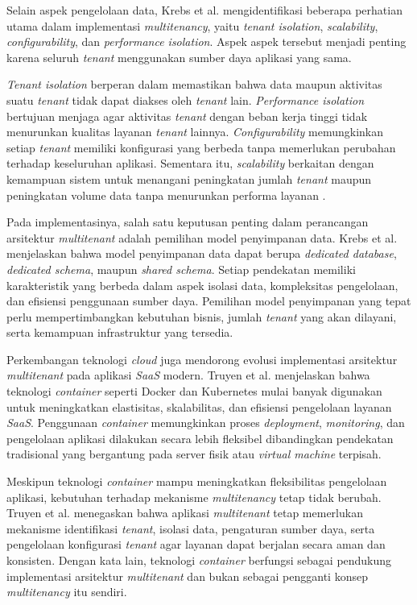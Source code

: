 Selain aspek pengelolaan data, Krebs et al. \cite{ref4} mengidentifikasi beberapa perhatian utama dalam implementasi \textit{multitenancy}, yaitu \textit{tenant isolation}, \textit{scalability}, \textit{configurability}, dan \textit{performance isolation}. Aspek aspek tersebut menjadi penting karena seluruh \textit{tenant} menggunakan sumber daya aplikasi yang sama.

\textit{Tenant isolation} berperan dalam memastikan bahwa data maupun aktivitas suatu \textit{tenant} tidak dapat diakses oleh \textit{tenant} lain. \textit{Performance isolation} bertujuan menjaga agar aktivitas \textit{tenant} dengan beban kerja tinggi tidak menurunkan kualitas layanan \textit{tenant} lainnya. \textit{Configurability} memungkinkan setiap \textit{tenant} memiliki konfigurasi yang berbeda tanpa memerlukan perubahan terhadap keseluruhan aplikasi. Sementara itu, \textit{scalability} berkaitan dengan kemampuan sistem untuk menangani peningkatan jumlah \textit{tenant} maupun peningkatan volume data tanpa menurunkan performa layanan \cite{ref12}.

Pada implementasinya, salah satu keputusan penting dalam perancangan arsitektur \textit{multitenant} adalah pemilihan model penyimpanan data. Krebs et al. \cite{ref12} menjelaskan bahwa model penyimpanan data dapat berupa \textit{dedicated database}, \textit{dedicated schema}, maupun \textit{shared schema}. Setiap pendekatan memiliki karakteristik yang berbeda dalam aspek isolasi data, kompleksitas pengelolaan, dan efisiensi penggunaan sumber daya. Pemilihan model penyimpanan yang tepat perlu mempertimbangkan kebutuhan bisnis, jumlah \textit{tenant} yang akan dilayani, serta kemampuan infrastruktur yang tersedia.

Perkembangan teknologi \textit{cloud} juga mendorong evolusi implementasi arsitektur \textit{multitenant} pada aplikasi \textit{SaaS} modern. Truyen et al. \cite{ref13} menjelaskan bahwa teknologi \textit{container} seperti Docker dan Kubernetes mulai banyak digunakan untuk meningkatkan elastisitas, skalabilitas, dan efisiensi pengelolaan layanan \textit{SaaS}. Penggunaan \textit{container} memungkinkan proses \textit{deployment}, \textit{monitoring}, dan pengelolaan aplikasi dilakukan secara lebih fleksibel dibandingkan pendekatan tradisional yang bergantung pada server fisik atau \textit{virtual machine} terpisah.

Meskipun teknologi \textit{container} mampu meningkatkan fleksibilitas pengelolaan aplikasi, kebutuhan terhadap mekanisme \textit{multitenancy} tetap tidak berubah. Truyen et al. \cite{ref13} menegaskan bahwa aplikasi \textit{multitenant} tetap memerlukan mekanisme identifikasi \textit{tenant}, isolasi data, pengaturan sumber daya, serta pengelolaan konfigurasi \textit{tenant} agar layanan dapat berjalan secara aman dan konsisten. Dengan kata lain, teknologi \textit{container} berfungsi sebagai pendukung implementasi arsitektur \textit{multitenant} dan bukan sebagai pengganti konsep \textit{multitenancy} itu sendiri.

